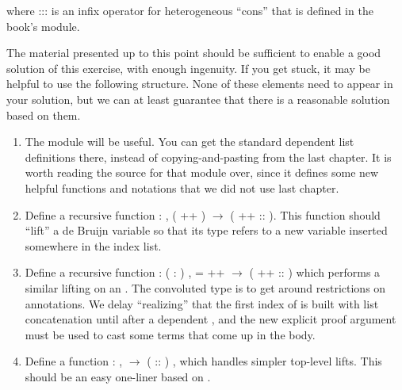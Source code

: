 \documentclass[12pt]{report}
\begin{document}
\begin{enumerate}
\begin{enumerate}
\coqdocemptyline
  where ::: is an infix operator for heterogeneous ``cons'' that is defined in the book's  module.
\end{enumerate}
  The material presented up to this point should be sufficient to enable a good solution of this exercise, with enough ingenuity.  If you get stuck, it may be helpful to use the following structure.  None of these elements need to appear in your solution, but we can at least guarantee that there is a reasonable solution based on them.
\begin{enumerate}
  \item The  module will be useful.  You can get the standard dependent list definitions there, instead of copying-and-pasting from the last chapter.  It is worth reading the source for that module over, since it defines some new helpful functions and notations that we did not use last chapter.
  \item Define a recursive function  : \coqdockw{\ensuremath{\forall}}    ,   ( ++ ) \ensuremath{\rightarrow}   ( ++  :: ).  This function should ``lift'' a de Bruijn variable so that its type refers to a new variable inserted somewhere in the index list.
  \item Define a recursive function  : \coqdockw{\ensuremath{\forall}}   ( :   )   ,  =  ++  \ensuremath{\rightarrow}  ( ++  :: )  which performs a similar lifting on an .  The convoluted type is to get around restrictions on  annotations.  We delay ``realizing'' that the first index of  is built with list concatenation until after a dependent , and the new explicit proof argument must be used to cast some terms that come up in the  body.
  \item Define a function  : \coqdockw{\ensuremath{\forall}}   ,    \ensuremath{\rightarrow}  ( :: ) , which handles simpler top-level lifts.  This should be an easy one-liner based on .

\end{enumerate}
\end{enumerate}
\end{document}
